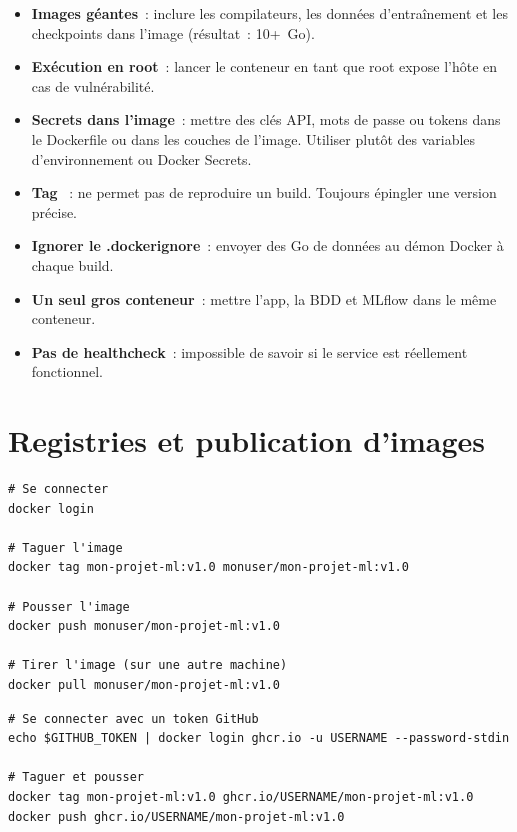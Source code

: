 \begin{antipattern}[title=\textbf{Anti-patterns Docker en ML}]
\begin{itemize}
  \item \textbf{Images g\'eantes}~: inclure les compilateurs, les donn\'ees
    d'entra\^inement et les checkpoints dans l'image (r\'esultat~: 10+~Go).
  \item \textbf{Ex\'ecution en root}~: lancer le conteneur en tant que root
    expose l'h\^ote en cas de vuln\'erabilit\'e.
  \item \textbf{Secrets dans l'image}~: mettre des cl\'es API, mots de passe
    ou tokens dans le Dockerfile ou dans les couches de l'image. Utiliser
    plut\^ot des variables d'environnement ou Docker Secrets.
  \item \textbf{Tag }~: ne permet pas de reproduire un build.
    Toujours \'epingler une version pr\'ecise.
  \item \textbf{Ignorer le .dockerignore}~: envoyer des Go de donn\'ees au
    d\'emon Docker \`a chaque build.
  \item \textbf{Un seul gros conteneur}~: mettre l'app, la BDD et MLflow
    dans le m\^eme conteneur.
  \item \textbf{Pas de healthcheck}~: impossible de savoir si le service
    est r\'eellement fonctionnel.
\end{itemize}
\end{antipattern}

\section{Registries et publication d'images}
\label{sec:registries}

\begin{codeblock}[title=\textbf{Publier une image sur Docker Hub}]
\begin{verbatim}
# Se connecter
docker login

# Taguer l'image
docker tag mon-projet-ml:v1.0 monuser/mon-projet-ml:v1.0

# Pousser l'image
docker push monuser/mon-projet-ml:v1.0

# Tirer l'image (sur une autre machine)
docker pull monuser/mon-projet-ml:v1.0
\end{verbatim}
\end{codeblock}

\begin{codeblock}[title=\textbf{Utiliser GitHub Container Registry}]
\begin{verbatim}
# Se connecter avec un token GitHub
echo $GITHUB_TOKEN | docker login ghcr.io -u USERNAME --password-stdin

# Taguer et pousser
docker tag mon-projet-ml:v1.0 ghcr.io/USERNAME/mon-projet-ml:v1.0
docker push ghcr.io/USERNAME/mon-projet-ml:v1.0
\end{verbatim}
\end{codeblock}

